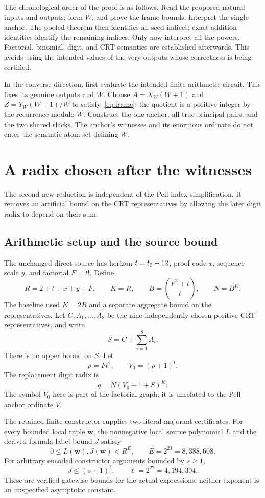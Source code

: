 \documentclass[11pt]{article}
\theoremstyle{definition}\newtheorem{definition}[theorem]{Definition}
\theoremstyle{remark}\newtheorem{remark}[theorem]{Remark}
\begin{document}
The chronological order of the proof is as follows. Read the proposed natural inputs and outputs, form $W$, and prove the frame bounds. Interpret the single anchor. The pooled theorem then identifies all seed indices; exact addition identities identify the remaining indices. Only now interpret all the powers. Factorial, binomial, digit, and CRT semantics are established afterwards. This avoids using the intended values of the very outputs whose correctness is being certified.

In the converse direction, first evaluate the intended finite arithmetic circuit. This fixes its genuine outputs and $W$. Choose $A=X_W(W+1)$ and $Z=Y_W(W+1)/W$ to satisfy~\eqref{eq:frame}; the quotient is a positive integer by the recurrence modulo $W$. Construct the one anchor, all true principal pairs, and the two shared slacks. The anchor's witnesses and its enormous ordinate do not enter the semantic atom set defining $W$.

\section{A radix chosen after the witnesses}

The second new reduction is independent of the Pell-index simplification. It removes an artificial bound on the CRT representatives by allowing the later digit radix to depend on their sum.

\subsection{Arithmetic setup and the source bound}

The unchanged direct source has horizon $t=t_0+12$, proof code $x$, sequence scale $y$, and factorial $F=t!$. Define
\[
 R=2+t+x+y+F,\qquad K=R,\qquad
 B=\binom{F^2+t}{t},\qquad N=B^K.
\]
The baseline used $K=2R$ and a separate aggregate bound on the representatives. Let $C,A_1,\ldots,A_8$ be the nine independently chosen positive CRT representatives, and write
\[
 S=C+\sum_{i=1}^8 A_i.
\]
There is no upper bound on $S$. Let
\[
 \rho=Ft^2,\qquad V_0=(\rho+1)^t.
\]
The replacement digit radix is
\begin{equation}\label{eq:radix}
 q=N(V_0+1+S)^K.
\end{equation}
The symbol $V_0$ here is part of the factorial graph; it is unrelated to the Pell anchor ordinate $V$.

The retained finite constructor supplies two literal majorant certificates. For every bounded local tuple $\mathbf w$, the nonnegative local source polynomial $L$ and the derived formula-label bound $J$ satisfy
\[
 0\le L(\mathbf w),J(\mathbf w)<R^E,\qquad E=2^{23}=8,388,608.
\]
For arbitrary encoded constructor arguments bounded by $s\ge1$,
\[
 J\le(s+1)^\ell,\qquad\ell=2^{22}=4,194,304.
\]
These are verified gatewise bounds for the actual expressions; neither exponent is an unspecified asymptotic constant.
\end{document}
